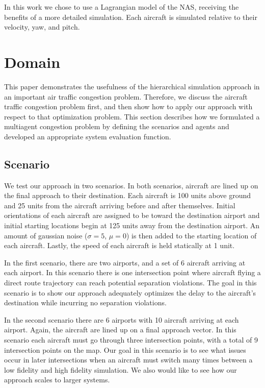 \documentclass{sig-alternate}
\begin{document}
In this work we chose to use a Lagrangian model of the NAS, receiving the benefits of a more detailed simulation. Each aircraft is simulated relative to their velocity, yaw, and pitch. 

\section{Domain}

This paper demonstrates the usefulness of the hierarchical simulation approach in an important air traffic congestion problem. Therefore, we discuss the aircraft traffic congestion problem first, and then show how to apply our approach with respect to that optimization problem. This section describes how we formulated a multiagent congestion problem by defining the scenarios and agents and developed an appropriate system evaluation function.

\subsection{Scenario}

We test our approach in two scenarios. In both scenarios, aircraft are lined up on the final approach to their destination. Each aircraft is 100 units above ground and 25 units from the aircraft arriving before and after themselves. Initial orientations of each aircraft are assigned to be toward the destination airport and initial starting locations begin at 125 units away from the destination airport. An amount of gaussian noise ($\sigma = 5$, $\mu = 0$) is then added to the starting location of each aircraft. Lastly, the speed of each aircraft is held statically at 1 unit.

In the first scenario, there are two airports, and a set of 6 aircraft arriving at each airport. In this scenario there is one intersection point where aircraft flying a direct route trajectory can reach potential separation violations. The goal in this scenario is to show our approach adequately optimizes the delay to the aircraft's destination while incurring no separation violations.

In the second scenario there are 6 airports with 10 aircraft arriving at each airport. Again, the aircraft are lined up on a final approach vector. In this scenario each aircraft must go through three intersection points, with a total of 9 intersection points on the map. Our goal in this scenario is to see what issues occur in later intersections when an aircraft must switch many times between a low fidelity and high fidelity simulation. We also would like to see how our approach scales to larger systems.
\end{document}
